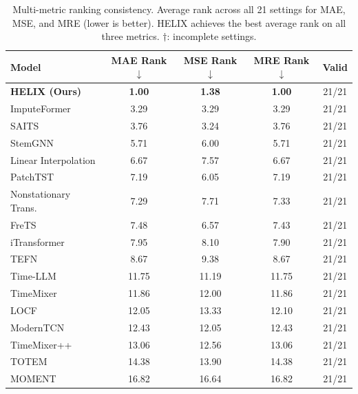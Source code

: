 \begin{table}[h]
    \caption{Multi-metric ranking consistency. Average rank across all 21 settings for MAE, MSE, and MRE (lower is better). HELIX achieves the best average rank on all three metrics. $\dagger$: incomplete settings.}
    \label{tab:multi_metric_ranking}
    \centering
    \begin{small}
    \begin{tabular}{l|ccc|c}
        \toprule
        \textbf{Model} & \textbf{MAE Rank}$\downarrow$ & \textbf{MSE Rank}$\downarrow$ & \textbf{MRE Rank}$\downarrow$ & \textbf{Valid} \\
        \midrule
        \textbf{HELIX (Ours)} & \textbf{1.00} & \textbf{1.38} & \textbf{1.00} & 21/21 \\
        ImputeFormer & 3.29 & 3.29 & 3.29 & 21/21 \\
        SAITS & 3.76 & 3.24 & 3.76 & 21/21 \\
        StemGNN & 5.71 & 6.00 & 5.71 & 21/21 \\
        Linear Interpolation & 6.67 & 7.57 & 6.67 & 21/21 \\
        PatchTST & 7.19 & 6.05 & 7.19 & 21/21 \\
        Nonstationary Trans. & 7.29 & 7.71 & 7.33 & 21/21 \\
        FreTS & 7.48 & 6.57 & 7.43 & 21/21 \\
        iTransformer & 7.95 & 8.10 & 7.90 & 21/21 \\
        TEFN & 8.67 & 9.38 & 8.67 & 21/21 \\
        Time-LLM & 11.75 & 11.19 & 11.75 & 21/21 \\
        TimeMixer & 11.86 & 12.00 & 11.86 & 21/21 \\
        LOCF & 12.05 & 13.33 & 12.10 & 21/21 \\
        ModernTCN & 12.43 & 12.05 & 12.43 & 21/21 \\
        TimeMixer++ & 13.06 & 12.56 & 13.06 & 21/21 \\
        TOTEM & 14.38 & 13.90 & 14.38 & 21/21 \\
        MOMENT & 16.82 & 16.64 & 16.82 & 21/21 \\
        \bottomrule
    \end{tabular}
    \end{small}
\end{table}